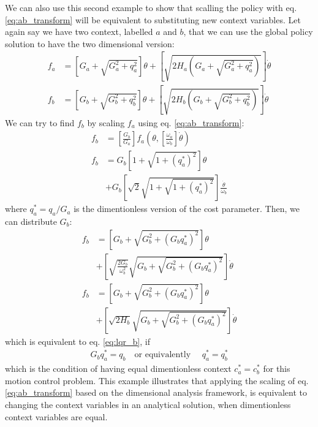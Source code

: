 We can also use this second example to show that scalling the policy with eq. \eqref{eq:ab_transform} will be equivalent to substituting new context variables. Let again say we have two context, labelled $a$ and $b$, that we can use the global policy solution to have the two dimensional version: 
\begin{align}
f_a &=
\left[ G_a + \sqrt{G_a^2+q_a^2}\right] \theta + \left[\sqrt{2H_a(G_a+\sqrt{G_a^2+q_a^2})}
\right] \dot{\theta} \\
f_b &=
\left[ G_b + \sqrt{G_b^2+q_b^2}\right] \theta + \left[\sqrt{2H_b(G_b+\sqrt{G_b^2+q_b^2})}
\right] \dot{\theta} \label{eq:lqr_b}
\end{align}
We can try to find $f_b$ by scaling $f_a$ using eq. \eqref{eq:ab_transform}:
\begin{align}
f_b &= \left[ \frac{G_b}{G_a} \right] f_a \left( \theta , \left[ \frac{\omega_a}{\omega_b} \right] \dot{\theta} \right) 
\\
f_b &= G_b \left[
1 + \sqrt{ 1 + (q_a^*)^2}
\right] \theta
\nonumber \\ & + G_b
\left[
\sqrt{2} \sqrt{ 1 + \sqrt{ 1 + (q_a^*)^2}} \right] \frac{\dot{\theta}}{\omega_b} 
\end{align}
where $q_a^* = q_a / G_a$ is the dimentionless version of the cost parameter. Then, we can distribute $G_b$:
\begin{align}
f_b &= \left[
G_b + \sqrt{ G_b^2 + (G_b q_a^*)^2}
\right] \theta
\nonumber \\ & +
\left[
\sqrt{\frac{2G_b}{\omega_b^2}} \sqrt{ G_b + \sqrt{ G_b^2 + (G_b q_a^*)^2}} \right] \dot{\theta}
\\
f_b &= \left[
G_b + \sqrt{ G_b^2 + (G_b q_a^*)^2}
\right] \theta
\nonumber \\ & +
\left[
\sqrt{2 H_b} \sqrt{ G_b + \sqrt{ G_b^2 + (G_b q_a^*)^2}} \right] \dot{\theta}
\end{align}
which is equivalent to eq. \eqref{eq:lqr_b}, if 
\begin{align}
G_b q_a^* = q_b \quad \text{or equivalently } \quad q_a^* = q_b^*
\end{align}
which is the condition of having equal dimentionless context $c_a^* = c_b^*$ for this motion control problem. This example illustrates that applying the scaling of eq. \eqref{eq:ab_transform} based on the dimensional analysis framework, is equivalent to changing the context variables in an analytical solution, when dimentionless context variables are equal.

